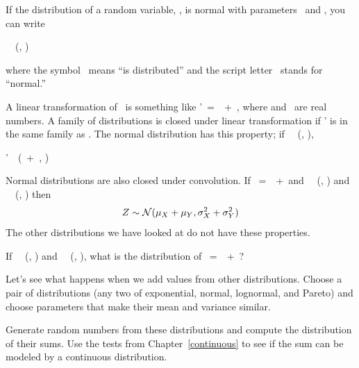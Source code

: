 \documentclass[12pt]{book}
\begin{document}
If the distribution of a random variable, \X, is
normal with parameters \mymu~and \mysigma, you can write

\quad \X~\mysim~\mynormal (\mymu, \mysigma)

where the symbol \mysim~means ``is distributed'' and the script letter
\mynormal~stands for ``normal.''


A linear transformation of \X~is something like \X'~=~\mya \X~+~\myb, where \mya
and \myb~are real numbers.
A family of distributions is closed under
linear transformation if \X' is in the same family as \X.  The normal
distribution has this property; if \X~\mysim~\mynormal (\mymu,
\sigmasq),

\quad \X'~\mysim~\mynormal (\mya \mymu~+~\myb, \mya{} \mysigma)

Normal distributions are also closed under convolution.  
If \Z~=~\X~+~\Y and
\X~\mysim~\mynormal (\mymu{}, \mysigma{}) and
\Y~\mysim~\mynormal (\mymu{}, \mysigma{}) then
%
\[ Z \sim \mathcal{N} (\mu_X + \mu_Y, \sigma_X^2 + \sigma_Y^2) \]
%
The other distributions we have looked at do not have these
properties.

\begin{exercise}
If 
\X~\mysim~\mynormal (\mymu{}, \mysigma{}) and
\Y~\mysim~\mynormal (\mymu{}, \mysigma{}), what 
is the distribution of \Z~=~\mya\X~+~\myb\Y?

\end{exercise}

\begin{exercise}
Let's see what happens when we add values from
other distributions.  Choose a pair of distributions (any two of
exponential, normal, lognormal, and Pareto) and choose parameters
that make their mean and variance similar.

Generate random numbers from these distributions and compute the
distribution of their sums.  Use the tests from
Chapter~\ref{continuous} to see if the sum can be modeled by a
continuous distribution.

\end{exercise}
\end{document}
